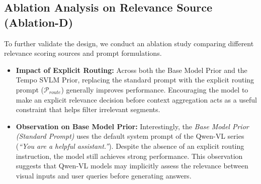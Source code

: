 \subsection{Ablation Analysis on Relevance Source (Ablation-D)}

To further validate the design, we conduct an ablation study comparing different relevance scoring sources and prompt formulations.

\begin{itemize}

\item \textbf{Impact of Explicit Routing:}
Across both the Base Model Prior and the Tempo SVLM Prior, replacing the standard prompt with the explicit routing prompt ($\mathcal{P}_{route}$) generally improves performance. Encouraging the model to make an explicit relevance decision before context aggregation acts as a useful constraint that helps filter irrelevant segments.

\item \textbf{Observation on Base Model Prior:}
Interestingly, the \emph{Base Model Prior (Standard Prompt)} uses the default system prompt of the Qwen-VL series (\ie \emph{``You are a helpful assistant.''}). Despite the absence of an explicit routing instruction, the model still achieves strong performance. This observation suggests that Qwen-VL models may implicitly assess the relevance between visual inputs and user queries before generating answers.

\end{itemize}